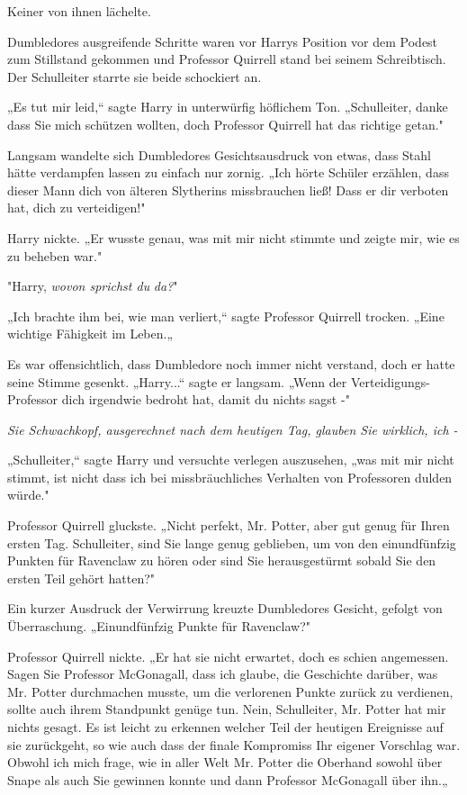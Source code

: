 {Keiner von ihnen lächelte.

Dumbledores ausgreifende Schritte waren vor Harrys Position vor dem Podest zum Stillstand gekommen und Professor Quirrell stand bei seinem Schreibtisch. Der Schulleiter starrte sie beide schockiert an.

„Es tut mir leid,“ sagte Harry in unterwürfig höflichem Ton. „Schulleiter, danke dass Sie mich schützen wollten, doch Professor Quirrell hat das richtige getan."

Langsam wandelte sich Dumbledores Gesichtsausdruck von etwas, dass Stahl hätte verdampfen lassen zu einfach nur zornig. „Ich hörte Schüler erzählen, dass dieser Mann dich von älteren Slytherins missbrauchen ließ! Dass er dir verboten hat, dich zu verteidigen!"

Harry nickte. „Er wusste genau, was mit mir nicht stimmte und zeigte mir, wie es zu beheben war."

"Harry, \emph{wovon sprichst du} \emph{da?}"

„Ich brachte ihm bei, wie man verliert,“ sagte Professor Quirrell trocken. „Eine wichtige Fähigkeit im Leben.„

Es war offensichtlich, dass Dumbledore noch immer nicht verstand, doch er hatte seine Stimme gesenkt. „Harry...“ sagte er langsam. „Wenn der Verteidigungs-Professor dich irgendwie bedroht hat, damit du nichts sagst -"

\emph{Sie Schwachkopf, ausgerechnet nach dem heutigen Tag, glauben Sie wirklich, ich -}

„Schulleiter,“ sagte Harry und versuchte verlegen auszusehen, „was mit mir nicht stimmt, ist nicht dass ich bei missbräuchliches Verhalten von Professoren dulden würde."

Professor Quirrell gluckste. „Nicht perfekt, Mr. Potter, aber gut genug für Ihren ersten Tag. Schulleiter, sind Sie lange genug geblieben, um von den einundfünfzig Punkten für Ravenclaw zu hören oder sind Sie herausgestürmt sobald Sie den ersten Teil gehört hatten?"

Ein kurzer Ausdruck der Verwirrung kreuzte Dumbledores Gesicht, gefolgt von Überraschung. „Einundfünfzig Punkte für Ravenclaw?"

Professor Quirrell nickte. „Er hat sie nicht erwartet, doch es schien angemessen. Sagen Sie Professor McGonagall, dass ich glaube, die Geschichte darüber, was Mr. Potter durchmachen musste, um die verlorenen Punkte zurück zu verdienen, sollte auch ihrem Standpunkt genüge tun. Nein, Schulleiter, Mr. Potter hat mir nichts gesagt. Es ist leicht zu erkennen welcher Teil der heutigen Ereignisse auf sie zurückgeht, so wie auch dass der finale Kompromiss Ihr eigener Vorschlag war. Obwohl ich mich frage, wie in aller Welt Mr. Potter die Oberhand sowohl über Snape als auch Sie gewinnen konnte und dann Professor McGonagall über ihn.„

}
